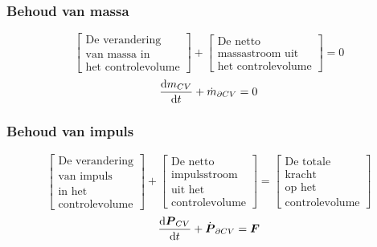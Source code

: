 \documentclass[t]{beamer}
\begin{document}
	\begin{frame}
		\frametitle{Behoud van massa}
		\vspace{1cm}
		\begin{equation*}
			\left[
				\begin{array}{c}
					\mbox{De verandering} \\ \mbox{van massa in} \\ \mbox{het controlevolume}
				\end{array}
			\right]
			+
			\left[
				\begin{array}{c}
					\mbox{De netto} \\ \mbox{massastroom uit} \\ \mbox{het controlevolume}
				\end{array}
			\right]
			= 0
			\label{eqn:controlevolume,behoud van massa,woorden}
		\end{equation*}
		\vspace{1cm}
		\pause
		\begin{equation}
			\frac{\mathrm{d} m_{CV}}{\mathrm{d} t} + \dot{m}_{\partial CV} = 0
			\label{eqn:controlevolume,behoud van massa}
		\end{equation}
	\end{frame}	
  	\begin{frame}
		\frametitle{Behoud van impuls}
		\vspace{0.7cm}
		\begin{equation*}
			\left[
				\begin{array}{c}
					\mbox{De verandering} \\ \mbox{van impuls} \\ \mbox{in het}  \\ \mbox{controlevolume}
				\end{array}
			\right]
			+
			\left[
				\begin{array}{c}
					\mbox{De netto} \\ \mbox{impulsstroom} \\ \mbox{uit het} \\ \mbox{controlevolume}
				\end{array}
			\right]
			=
			\left[
				\begin{array}{c}
					\mbox{De totale} \\ \mbox{kracht} \\ \mbox{op het} \\ \mbox{controlevolume}
				\end{array}
			\right]
			\label{eqn:controlevolume,behoud van impuls,woorden}
		\end{equation*}
		\vspace{1cm}
		\pause
		\begin{equation}
			\frac{\mathrm{d} \boldsymbol{P}_{CV}}{\mathrm{d} t} + \dot{\boldsymbol{P}}_{\partial CV} =  \boldsymbol{F}
			\label{eqn:controlevolume,behoud van impuls}
		\end{equation}
	\end{frame}	
\end{document}
